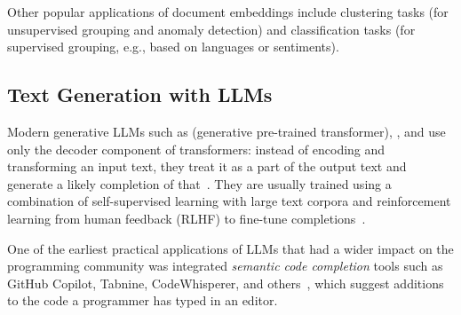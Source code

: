 Other popular applications of document embeddings include clustering tasks (for unsupervised grouping and anomaly detection) and classification tasks (for supervised grouping, e.g., based on languages or sentiments).

\subsection*{Text Generation with LLMs}
\label{sec:background/semtec/generation}

Modern generative LLMs such as  (generative pre-trained transformer), , and  use only the decoder component of transformers:
instead of encoding and transforming an input text, they treat it as a part of the output text and generate a likely completion of that~\cite{radford2018improving,openai2024gpt4}.
They are usually trained using a combination of self-supervised learning with large text corpora and reinforcement learning from human feedback (RLHF) to fine-tune completions~\cite{ouyang2022training}.

One of the earliest practical applications of LLMs that had a wider impact on the programming community was integrated \emph{semantic code completion} tools such as GitHub Copilot, Tabnine, CodeWhisperer, and others~\cite{chen2021evaluating,barka2023grounded}, which suggest additions to the code a programmer has typed in an editor.


